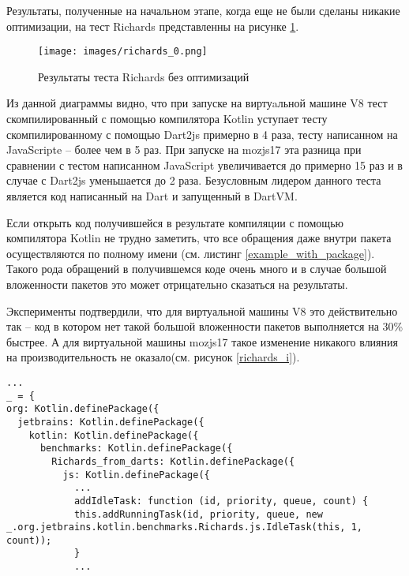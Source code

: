 Результаты, полученные на начальном этапе, когда еще не были сделаны никакие оптимизации, на тест Richards представленны на рисунке \ref{richards_0}.

\begin{figure}[ht!]
\centering
\texttt{[image: images/richards\_0.png]}
\caption{Результаты теста Richards без оптимизаций}
\label{richards_0}
\end{figure}

Из данной диаграммы видно, что при запуске на виртуaльной машине V8 тест скомпилированный с помощью компилятора Kotlin уступает тесту скомпилированному с помощью Dart2js примерно в 4 раза, тесту написанном на JavaScripte -- более чем в 5 раз. При запуске на mozjs17 эта разница при сравнении с тестом написанном JavaScript увеличивается до примерно 15 раз и в случае с Dart2js уменьшается до 2 раза. Безусловным лидером данного теста является код написанный на Dart и запущенный в DartVM.

Если открыть код получившейся в результате компиляции с помощью компилятора Kotlin не трудно заметить, что все обращения даже внутри пакета осуществляются по полному имени (см. листинг \ref{example_with_package}). Такого рода обращений в получившемся коде очень много и в случае большой вложенности пакетов это может отрицательно сказаться на результаты. 

Эксперименты подтвердили, что для виртуальной машины V8 это действительно так -- код в котором нет такой большой вложенности пакетов выполняется на 30\% быстрее. А для виртуальной машины mozjs17 такое изменение никакого влияния на производительность не оказало(см. рисунок \ref{richards_i}).


\begin{code}
\begin{lstlisting}[caption=Пример код с обращением по полному имени внутри того же пакета, label=example_with_package]
...
_ = {
org: Kotlin.definePackage({
  jetbrains: Kotlin.definePackage({
    kotlin: Kotlin.definePackage({
      benchmarks: Kotlin.definePackage({
        Richards_from_darts: Kotlin.definePackage({
          js: Kotlin.definePackage({
            ...
            addIdleTask: function (id, priority, queue, count) {
            this.addRunningTask(id, priority, queue, new _.org.jetbrains.kotlin.benchmarks.Richards.js.IdleTask(this, 1, count));
            }
            ...
\end{lstlisting}
\end{code}

